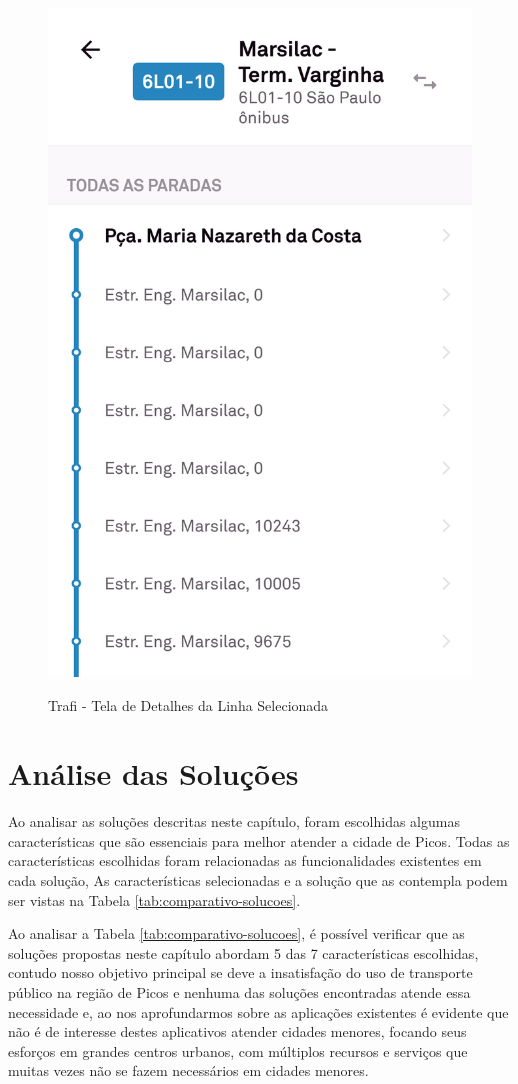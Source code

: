 \begin{figure}[H]
\caption{Trafi - Tela de Detalhes da Linha Selecionada}
\centering
\includegraphics[width=.4\textwidth]{imagens/traffi.png}
\label{fig:trafi}
\end{figure}

\section{Análise das Soluções}

Ao analisar as soluções descritas neste capítulo, foram escolhidas algumas características que são essenciais para melhor atender a cidade de Picos. Todas as características escolhidas foram relacionadas as funcionalidades existentes em cada solução, As características selecionadas e a solução que as contempla podem ser vistas na Tabela \ref{tab:comparativo-solucoes}.

Ao analisar a Tabela \ref{tab:comparativo-solucoes}, é possível verificar que as soluções propostas neste capítulo abordam 5 das 7 características escolhidas, contudo nosso objetivo principal se deve a insatisfação do uso de transporte público na região de Picos e nenhuma das soluções encontradas atende essa necessidade e, ao nos aprofundarmos sobre as aplicações existentes é evidente que não é de interesse destes aplicativos atender cidades menores, focando seus esforços em grandes centros urbanos, com múltiplos recursos e serviços que muitas vezes não se fazem necessários em cidades menores.

